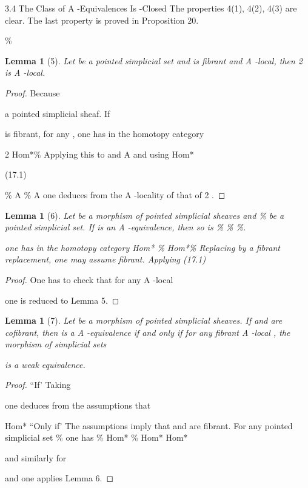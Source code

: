 \documentclass[11pt,a4paper]{article}
\theoremstyle{plain}
\newtheorem{lemma}[theorem]{Lemma}
\theoremstyle{definition}
\begin{document}
3.4 The Class of A -Equivalences Is -Closed
The properties 4(1), 4(2), 4(3) are clear. The last property is proved in Proposition 20.

\%

\begin{lemma}[5]
Let be a pointed simplicial set and
is fibrant and A -local, then 2 is A -local.
\end{lemma}

\begin{proof} Because



 a pointed simplicial sheaf. If 

 is fibrant, for any  , one has in the homotopy category

  2  Hom*\%  
Applying this to  and  A  and using
Hom*

(17.1)

\%   A  \%  A 
one deduces from the A -locality of  that of  2 .

\end{proof}

\begin{lemma}[6]
Let 
be a morphism of pointed simplicial sheaves and \% be a
pointed simplicial set. If  is an A -equivalence, then so is  \%  \%
 \%.



 one has in the homotopy category
Hom* \%
  Hom*\%  
Replacing  by a fibrant replacement, one may assume  fibrant. Applying (17.1)
\end{lemma}

\begin{proof} One has to check that for any A -local



one is reduced to Lemma 5.



\end{proof}

\begin{lemma}[7]
Let
be a morphism of pointed simplicial sheaves. If and
are cofibrant, then is a A -equivalence if and only if for any fibrant A -local
, the morphism of simplicial sets





     
is a weak equivalence.
\end{lemma}

\begin{proof} ``If' Taking

 one deduces from the assumptions that

   Hom*  
``Only if' The assumptions imply that    and    are fibrant. For any
pointed simplicial set \% one has
\% 
Hom* \%    Hom* 
Hom*

and similarly for



and one applies Lemma 6.

\end{proof}
\end{document}
